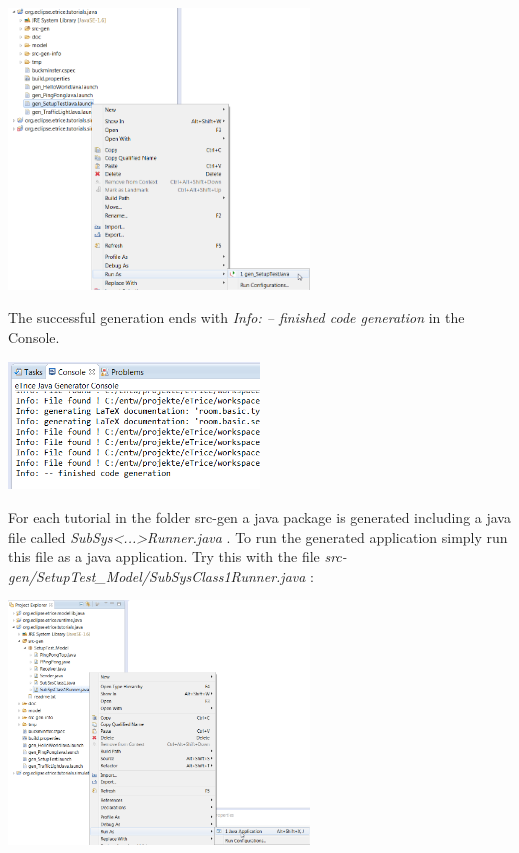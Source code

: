\includegraphics[width=0.6\textwidth]{images/013-SetupWorkspace05.png}

The successful generation ends with \emph{Info: -- finished code generation} in the Console.

\includegraphics[width=0.5\textwidth]{images/013-SetupWorkspace051.png}

For each tutorial in the folder src-gen a java package is generated including a java file called 
\emph{SubSys<...>Runner.java} . To run the generated application simply run this file as a java application.
Try this with the file \emph{src-gen/SetupTest\_Model/SubSysClass1Runner.java} :

\includegraphics[width=0.6\textwidth]{images/013-SetupWorkspace06.png}

